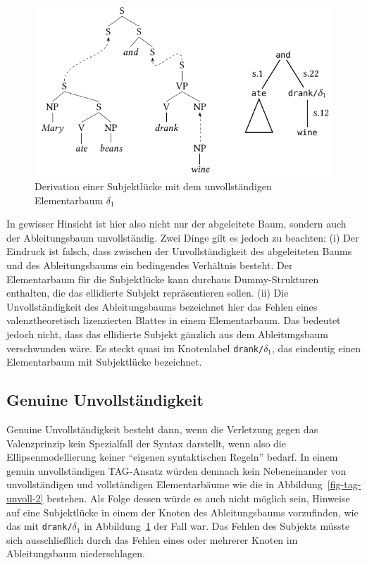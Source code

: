 \begin{figure}[t]
\centering
\includegraphics{graphics/abb832.pdf}
\caption{\label{fig-tag-unvoll-3}Derivation einer Subjektlücke mit dem unvollständigen Elementarbaum $\delta_1$}
\end{figure}
In gewisser Hinsicht ist hier also nicht nur der abgeleitete Baum, sondern auch der Ableitungsbaum unvollständig. Zwei Dinge gilt es jedoch zu beachten: (i) Der Eindruck ist falsch, dass zwischen der Unvollständigkeit des abgeleiteten Baums und des Ableitungsbaums ein bedingendes Verhältnis besteht. Der Elementarbaum für die Subjektlücke kann durchaus Dummy-Strukturen enthalten, die das ellidierte Subjekt repräsentieren sollen. (ii) Die Unvollständigkeit des Ableitungsbaums bezeichnet hier das Fehlen eines valenztheoretisch lizenzierten Blattes in einem Elementarbaum. Das bedeutet jedoch nicht, dass das ellidierte Subjekt gänzlich aus dem Ableitungsbaum verschwunden wäre. Es steckt quasi im Knotenlabel {\tt drank/$\delta_1$}, das eindeutig einen Elementarbaum mit Subjektlücke bezeichnet. 





\subsection{Genuine Unvollständigkeit}

Genuine Unvollständigkeit besteht dann, wenn die Verletzung gegen das Valenzprinzip kein Spezialfall der Syntax darstellt, wenn also die Ellipsenmodellierung keiner "`eigenen syntaktischen Regeln"' bedarf. In einem genuin unvollständigen TAG-Ansatz würden demnach kein Nebeneinander von unvollständigen und vollständigen Elementarbäume wie die in Abbildung~\ref{fig-tag-unvoll-2} bestehen. Als Folge dessen würde es auch nicht möglich sein, Hinweise auf eine Subjektlücke in einem der Knoten des Ableitungsbaums vorzufinden, wie das mit {\tt drank/$\delta_1$} in Abbildung~\ref{fig-tag-unvoll-3} der Fall war. Das Fehlen des Subjekts müsste sich ausschlie\ss lich durch das Fehlen eines oder mehrerer Knoten im Ableitungsbaum niederschlagen. 

